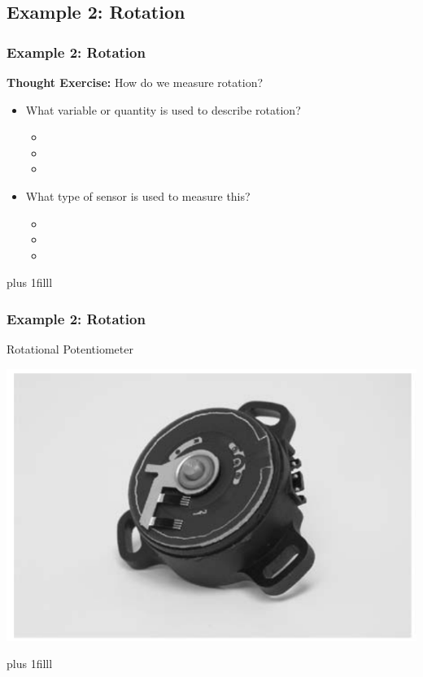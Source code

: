 \documentclass[fleqn]{beamer} %
\newcommand{\sectionIsubsectionIIItitle}{Example 2: Rotation}
\newcommand{\btVFill}{\vskip0pt plus 1filll}
\begin{document}
		\subsection{\sectionIsubsectionIIItitle}\label{sectionIsubsectionIII}
			\begin{frame} 
				\frametitle{\sectionIsubsectionIIItitle}

				{\bf Thought Exercise:} How do we measure {\BL rotation}?        
	
					\begin{itemize}
					
						\item What variable or quantity is used to describe {\BL rotation}?                         
						\begin{itemize}
							\item
							\item
							\item	
						\end{itemize} \vspace{5mm}
						\item What type of sensor is used to measure this?
						\begin{itemize}
							\item
							\item
							\item	
						\end{itemize}	

					\end{itemize}
				
				\btVFill
			  
				
			\end{frame}	

			\begin{frame} 
				\frametitle{\sectionIsubsectionIIItitle}

				Rotational Potentiometer 

				\includegraphics[scale=.25]{images/rot_pot.png}

				\btVFill	

			\end{frame}	
\end{document}
